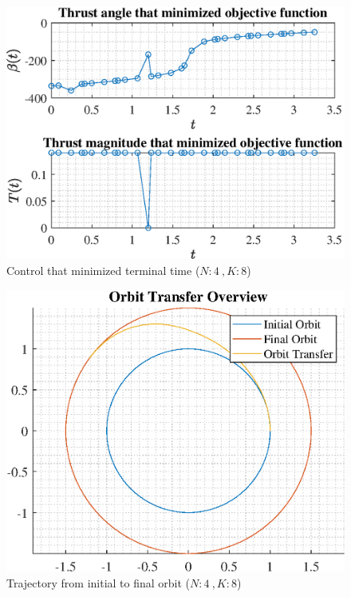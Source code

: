 \documentclass[]{article}
\begin{document}
\begin{figure}
	\centering
	\includegraphics[scale=0.75]{control_N4_K8_C2_tf.eps}
	\caption{Control that minimized terminal time (\(N:4\ , K:8\))}
	\label{fig:control_N4_K8_C2_tf}
\end{figure}
\begin{figure}
	\centering
	\includegraphics[scale=0.75]{orbit_N4_K8_C2_tf.eps}
	\caption{Trajectory from initial to final orbit (\(N:4\ , K:8\))}
	\label{fig:orbit_N4_K8_C2_tf}
\end{figure}
\end{document}
